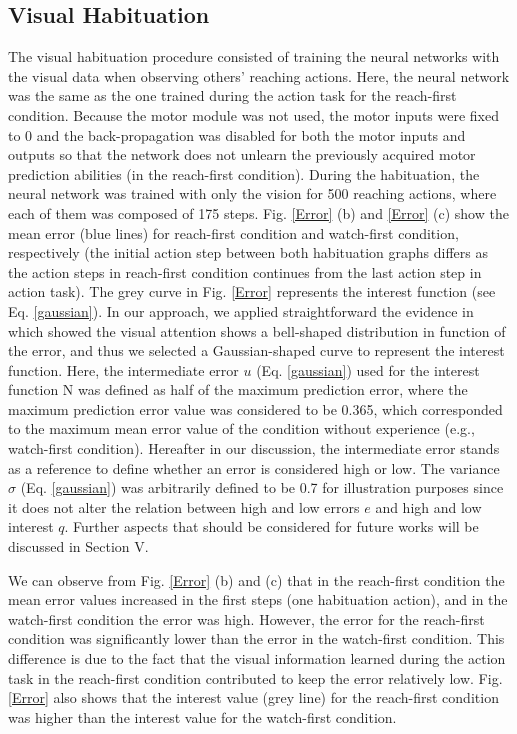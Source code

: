 \documentclass[conference]{IEEEtran}
\begin{document}
\subsection{Visual Habituation}
The visual habituation procedure consisted of training the neural networks with the visual data when observing others' reaching actions. Here, the neural network was the same as the one trained during the action task for the reach-first condition. Because the motor module was not used, the motor inputs were fixed to $0$ and the back-propagation was disabled for both the motor inputs and outputs so that the network does not unlearn the previously acquired motor prediction abilities (in the reach-first condition). During the habituation, the neural network was trained with only the vision for 500 reaching actions, where each of them was composed of 175 steps. Fig. \ref{Error} (b) and \ref{Error} (c) show the mean error (blue lines) for reach-first condition and watch-first condition, respectively (the initial action step between both habituation graphs differs as the action steps in reach-first condition continues from the last action step in action task). The grey curve in Fig. \ref{Error} represents the interest function (see Eq. \ref{gaussian}). In our approach, we applied straightforward the evidence in \cite{kidd2012goldilocks} which showed the visual attention shows a bell-shaped distribution in function of the error, and thus we selected a Gaussian-shaped curve to represent the interest function. Here, the intermediate error \(\textit{u}\) (Eq. \ref{gaussian}) used for the interest function \(\text{N}\) was defined as half of the maximum prediction error, where the maximum prediction error value was considered to be 0.365, which corresponded to the maximum mean error value of the condition without experience (e.g., watch-first condition). Hereafter in our discussion, the intermediate error stands as a reference to define whether an error is considered high or low. The variance \(\sigma\) (Eq. \ref{gaussian}) was arbitrarily defined to be 0.7 for illustration purposes since it does not alter the relation between high and low errors \(\textit{e}\) and high and low interest \(\textit{q}\). Further aspects that should be considered for future works will be discussed in Section V. 

We can observe from Fig. \ref{Error} (b) and (c) that in the reach-first condition the mean error values increased in the first steps (one habituation action), and in the watch-first condition the error was high. However, the error for the reach-first condition was significantly lower than the error in the watch-first condition. This difference is due to the fact that the visual information learned during the action task in the reach-first condition contributed to keep the error relatively low. Fig. \ref{Error} also shows that the interest value (grey line) for the reach-first condition was higher than the interest value for the watch-first condition.
\end{document}
